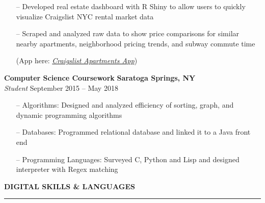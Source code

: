 \documentclass[paper=a4, fontsize=11pt]{scrartcl} %
\newcommand{\I}{--}
\newenvironment{mycenter}[1][\topsep]
{\setlength{\topsep}{#1}\par\kern\topsep\centering}%
{\par\kern\topsep}%
\begin{document}
\begin{itemize}[topsep=0pt,noitemsep]

  \item[\I] Developed real estate dashboard with R Shiny to allow users to quickly visualize Craigslist NYC rental market data
  \item[\I] Scraped and analyzed raw data to show price comparisons for similar nearby apartments, neighborhood pricing trends, and subway commute time
  
  (App here:  \emph{\href{https://byronpop.shinyapps.io/CraigslistApartmentsApp/}{Craigslist Apartments App}})

\end{itemize}

 

\vspace{1mm}

 

\textbf{Computer Science Coursework} \hfill \textbf{Saratoga Springs, NY}\\
\textit{Student}
\hspace*{\fill}  September 2015 -- May 2018

\begin{itemize}[topsep=0pt,noitemsep]

  \item[\I] Algorithms: Designed and analyzed efficiency of sorting, graph, and dynamic programming algorithms
  \item[\I] Databases:  Programmed relational database and linked it to a Java front end
  \item[\I] Programming Languages: Surveyed C, Python and Lisp and designed interpreter with Regex matching 
 

  \end{itemize}

\vspace{2mm}

 

\begin{mycenter}[0pt]

\textsc{\textbf{DIGITAL SKILLS \& LANGUAGES}}

\end{mycenter}

\vspace{-3mm}

\rule{\textwidth}{0.4pt}

\vspace{1mm}
\end{document}

